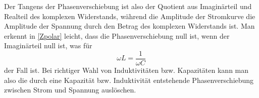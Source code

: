 Der Tangens der Phasenverschiebung ist also der Quotient aus Imaginärteil und Realteil des komplexen Widerstands, während die Amplitude der Stromkurve die Amplitude der Spannung durch den Betrag des komplexen Widerstands ist.
Man erkennt in \eqref{Zpolar} leicht, dass die Phasenverschiebung null ist, wenn der Imaginärteil null ist, was für 
\begin{equation}
\omega L = \frac{1}{\omega C}
\end{equation}
der Fall ist. Bei richtiger Wahl von Induktivitäten bzw. Kapazitäten kann man also die durch eine Kapazität bzw. Induktivität entstehende Phasenverschiebung zwischen Strom und Spannung auslöschen.
